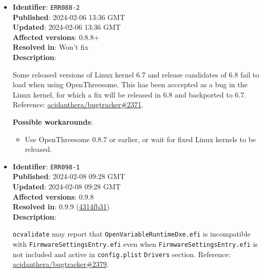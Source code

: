 \documentclass[]{article}
\providecommand{\tightlist}{%
  \setlength{\itemsep}{0pt}\setlength{\parskip}{0pt}}
\begin{document}
\begin{itemize}
  Loading macOS in OpenThreesome may fail. Reference:
  \href{https://github.com/acidanthera/bugtracker/issues/2190}{acidanthera/bugtracker\#2190}.

  \textbf{Possible workarounds}:
  \begin{itemize}
    \tightlist

    \item Update OpenThreesome to master version

  \end{itemize}

\item
  \textbf{Identifier}: \texttt{ERR088-2} \\
  \textbf{Published}: 2024-02-06 13:36 GMT \\
  \textbf{Updated}: 2024-02-06 13:36 GMT \\
  \textbf{Affected versions}: 0.8.8+ \\
  \textbf{Resolved in}: Won't fix \\
  \textbf{Description}:

  Some released versions of Linux kernel 6.7 and release candidates of 6.8
  fail to load when using OpenThreesome. This has been acccepted as a bug in the
  Linux kernel, for which a fix will be released in 6.8 and backported to 6.7.
  Reference:
  \href{https://github.com/acidanthera/bugtracker/issues/2371#issuecomment-1929638701}{acidanthera/bugtracker\#2371}.

  \textbf{Possible workarounds}:
  \begin{itemize}
    \tightlist

    \item Use OpenThreesome 0.8.7 or earlier, or wait for fixed Linux kernels to
    be released.

  \end{itemize}

\item
  \textbf{Identifier}: \texttt{ERR098-1} \\
  \textbf{Published}: 2024-02-08 09:28 GMT \\
  \textbf{Updated}: 2024-02-08 09:28 GMT \\
  \textbf{Affected versions}: 0.9.8 \\
  \textbf{Resolved in}: 0.9.9 (\href{https://github.com/acidanthera/OpenCorePkg/commit/4314fb31ecb974c30f99ac17db1f2b67ce1bb765}{4314fb31}) \\
  \textbf{Description}:

  \texttt{ocvalidate} may report that \texttt{OpenVariableRuntimeDxe.efi} is
  incompatible with \texttt{FirmwareSettingsEntry.efi} even when
  \texttt{FirmwareSettingsEntry.efi} is not included and active in \texttt{config.plist}
  \texttt{Drivers} section. Reference:
  \href{https://github.com/acidanthera/bugtracker/issues/2379}{acidanthera/bugtracker\#2379}.


\end{itemize}
\end{document}
